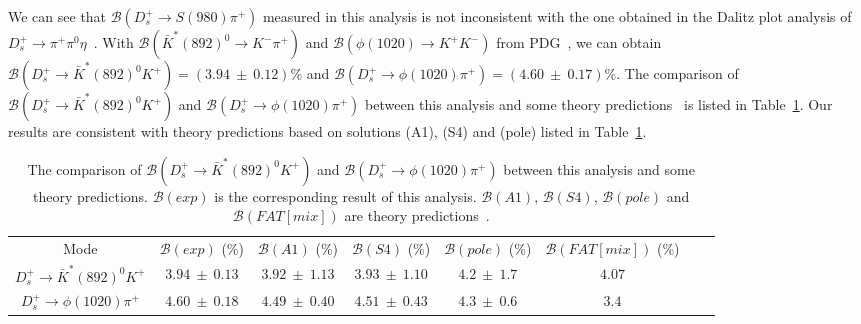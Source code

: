 {    We can see that $\mathcal{B}(D_{s}^{+} \rightarrow S(980)\pi^{+})$ measured in this analysis is not inconsistent with the one obtained in the Dalitz plot analysis of $D_{s}^{+} \rightarrow \pi^{+}\pi^{0}\eta$~\cite{Doc-DB-682-v7}.
    With $\mathcal{B}(\bar{K}^{*}(892)^{0} \rightarrow K^{-}\pi^{+})$ and $\mathcal{B}(\phi(1020) \rightarrow K^{+}K^{-})$ from PDG~\cite{PDG2018}, we can obtain $\mathcal{B}(D_{s}^{+} \rightarrow \bar{K}^{*}(892)^{0}K^{+}) = (3.94\ \pm\ 0.12)\%$ and $\mathcal{B}(D_{s}^{+} \rightarrow \phi(1020)\pi^{+}) = (4.60\ \pm\ 0.17)\%$.
    The comparison of  $\mathcal{B}(D_{s}^{+} \rightarrow \bar{K}^{*}(892)^{0}K^{+})$ and $\mathcal{B}(D_{s}^{+} \rightarrow \phi(1020)\pi^{+})$ between this analysis and some theory predictions~\cite{PRD93-114010} is listed in Table~\ref{theory-prediction}.
    Our results are consistent with theory predictions based on solutions (A1), (S4) and (pole) listed in Table~\ref{theory-prediction}.
    \begin{table}[htbp]
        \caption{The comparison of $\mathcal{B}(D_{s}^{+} \rightarrow \bar{K}^{*}(892)^{0}K^{+})$ and $\mathcal{B}(D_{s}^{+} \rightarrow \phi(1020)\pi^{+})$ between this analysis and some theory predictions.
            $\mathcal{B}(exp)$ is the corresponding result of this analysis.  $\mathcal{B}(A1)$, $\mathcal{B}(S4)$, $\mathcal{B}(pole)$ and $\mathcal{B}(FAT[mix])$ are theory predictions~\cite{PRD93-114010}. 
        }
        \label{theory-prediction}
        \begin{center}
            \begin{tabular}{cccccccc}
                \toprule\toprule
                Mode & $\mathcal{B}(exp)$ (\%)   & $\mathcal{B}(A1)$ (\%)& $\mathcal{B}(S4)$ (\%)&  $\mathcal{B}(pole)$ (\%)&$\mathcal{B}(FAT[mix])$ (\%)&\\
                $D_{s}^{+} \rightarrow \bar{K}^{*}(892)^{0}K^{+}$           & $3.94\ \pm\ 0.13$    & $3.92\ \pm\ 1.13$  & $3.93\ \pm\ 1.10$  & $4.2\ \pm\ 1.7$  & $4.07$  \\
                $D_{s}^{+} \rightarrow \phi(1020)\pi^{+}$                   & $4.60\ \pm\ 0.18$    & $4.49\ \pm\ 0.40$  & $4.51\ \pm\ 0.43$  & $4.3\ \pm\ 0.6$  & $3.4$  \\
                \hline
                \bottomrule\bottomrule
            \end{tabular}
        \end{center}
    \end{table}

}


